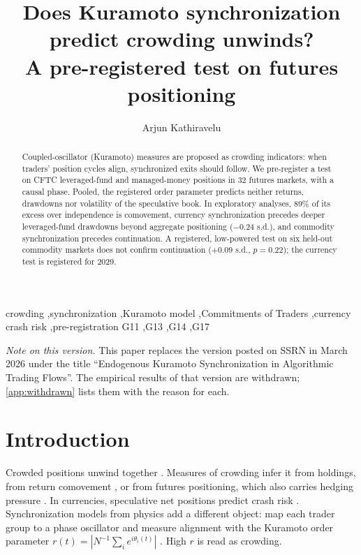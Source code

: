 \documentclass[preprint,12pt,authoryear]{elsarticle}
\begin{document}
\begin{frontmatter}

\title{Does Kuramoto synchronization predict crowding unwinds?\\
A pre-registered test on futures positioning}

\author{Arjun Kathiravelu}
\address{University of Geneva, Geneva, Switzerland}

\begin{abstract}
Coupled-oscillator (Kuramoto) measures are proposed as crowding indicators:
when traders' position cycles align, synchronized exits should follow. We
pre-register a test on CFTC leveraged-fund and managed-money positions in 32
futures markets, with a causal phase. Pooled, the registered order
parameter predicts neither returns, drawdowns nor volatility of the
speculative book. In exploratory analyses, 89\% of its excess over
independence is comovement, currency synchronization precedes deeper
leveraged-fund drawdowns beyond aggregate positioning ($-0.24$ s.d.), and
commodity synchronization precedes continuation. A registered, low-powered
test on six held-out commodity markets does not confirm continuation
($+0.09$ s.d., $p=0.22$); the currency test is registered for 2029.
\end{abstract}

\begin{keyword}
crowding \sep synchronization \sep Kuramoto model \sep Commitments of Traders
\sep currency crash risk \sep pre-registration
\JEL G11 \sep G13 \sep G14 \sep G17
\end{keyword}
\end{frontmatter}

\noindent\textit{Note on this version.} This paper replaces the version posted
on SSRN in March 2026 under the title ``Endogenous Kuramoto Synchronization in
Algorithmic Trading Flows''. The empirical results of that version are
withdrawn; \ref{app:withdrawn} lists them with the reason for each.

\section{Introduction}

Crowded positions unwind together \citep{Pedersen2009,Stein2009,KhandaniLo2011}.
Measures of crowding infer it from holdings, from return comovement
\citep{LouPolk2022}, or from futures positioning, which also carries hedging
pressure \citep{Bessembinder1992,deRoon2000,KangRouwenhorstTang2020}. In
currencies, speculative net positions predict crash risk
\citep{BrunnermeierNagelPedersen2008}. Synchronization models from physics add
a different object: map each trader group to a phase oscillator and measure
alignment with the Kuramoto order parameter
$r(t) = |N^{-1}\sum_i e^{i\theta_i(t)}|$ \citep{Strogatz2000,Acebron2005}.
High $r$ is read as crowding.
\end{document}
